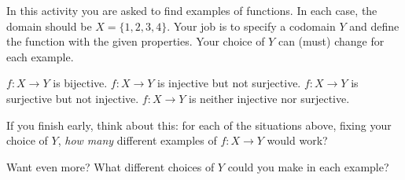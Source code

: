 \documentclass[11pt]{exam}
\begin{document}
In this activity you are asked to find examples of functions.  In each case, the domain should be $X = \{1,2,3,4\}$.  Your job is to specify a codomain $Y$ and define the function with the given properties.  Your choice of $Y$ can (must) change for each example.
\begin{questions}
\question $f:X \to Y$ is bijective.
\vfill
\question $f:X \to Y$ is injective but not surjective.
\vfill
\question $f:X \to Y$ is surjective but not injective.
\vfill
\question $f:X \to Y$ is neither injective nor surjective.
\vfill
\end{questions}
If you finish early, think about this: for each of the situations above, fixing your choice of $Y$, {\em how many} different examples of $f:X \to Y$ would work?

Want even more?  What different choices of $Y$ could you make in each example?
\end{document}
